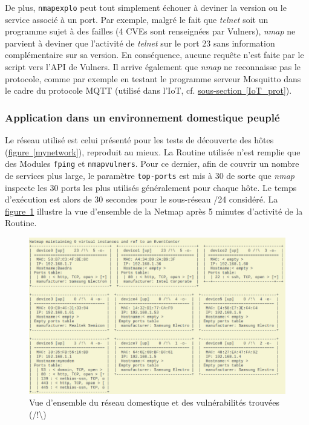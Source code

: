 \documentclass[]{article}
\newcommand{\wordlink}[2]{\hyperref[#1]{#2~\ref{#1}}}
\begin{document}
\par De plus, \texttt{nmapexplo} peut tout simplement échouer à deviner la version ou le service associé à un port. Par exemple, malgré le fait que \textit{telnet} soit un programme sujet à des failles (4 CVEs sont renseignées par Vulners), \textit{nmap} ne parvient à deviner que l'activité de \textit{telnet} sur le port 23 sans information complémentaire sur sa version. En conséquence, aucune requête n'est faite par le script vers l'API de Vulners. Il arrive également que \textit{nmap} ne reconnaisse pas le protocole, comme par exemple en testant le programme serveur Mosquitto dans le cadre du protocole MQTT (utilisé dans l'IoT, cf. \wordlink{IoT_prot}{sous-section}).

\newpage

\subsubsection{Application dans un environnement domestique peuplé}

Le réseau utilisé est celui présenté pour les tests de découverte des hôtes (\wordlink{mynetwork}{figure}), reproduit au mieux. La Routine utilisée n'est remplie que des Modules \texttt{fping} et \texttt{nmapvulners}. Pour ce dernier, afin de couvrir un nombre de services plus large, le paramètre \texttt{top-ports} est mis à 30 de sorte que \textit{nmap} inspecte les 30 ports les plus utilisés généralement pour chaque hôte. Le temps d'exécution est alors de 30 secondes pour le sous-réseau /24 considéré. La \wordlink{realvulns}{figure} illustre la vue d'ensemble de la Netmap après 5 minutes d'activité de la Routine. 

\begin{figure}[!ht]
\centering
     \includegraphics[width=1\linewidth]{netmapvulns}
     \caption{Vue d'ensemble du réseau domestique et des vulnérabilités trouvées (/!\textbackslash)}
     \label{realvulns}
\end{figure}
\end{document}
